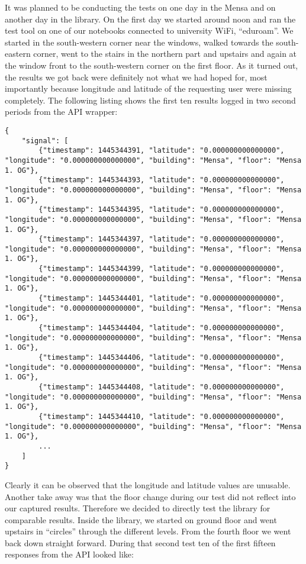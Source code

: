 It was planned to be conducting the tests on one day in the Mensa and on another day in the library. On the first day we started around noon and ran the test tool on one of our notebooks connected to university WiFi, \enquote{eduroam}. We started in the south-western corner near the windows, walked towards the south-eastern corner, went to the stairs in the northern part and upstairs and again at the window front to the south-western corner on the first floor. As it turned out, the results we got back were definitely not what we had hoped for, most importantly because longitude and latitude of the requesting user were missing completely. The following listing shows the first ten results logged in two second periods from the API wrapper:

\begin{lstlisting}
{
    "signal": [
        {"timestamp": 1445344391, "latitude": "0.000000000000000", "longitude": "0.000000000000000", "building": "Mensa", "floor": "Mensa 1. OG"},
        {"timestamp": 1445344393, "latitude": "0.000000000000000", "longitude": "0.000000000000000", "building": "Mensa", "floor": "Mensa 1. OG"},
        {"timestamp": 1445344395, "latitude": "0.000000000000000", "longitude": "0.000000000000000", "building": "Mensa", "floor": "Mensa 1. OG"},
        {"timestamp": 1445344397, "latitude": "0.000000000000000", "longitude": "0.000000000000000", "building": "Mensa", "floor": "Mensa 1. OG"},
        {"timestamp": 1445344399, "latitude": "0.000000000000000", "longitude": "0.000000000000000", "building": "Mensa", "floor": "Mensa 1. OG"},
        {"timestamp": 1445344401, "latitude": "0.000000000000000", "longitude": "0.000000000000000", "building": "Mensa", "floor": "Mensa 1. OG"},
        {"timestamp": 1445344404, "latitude": "0.000000000000000", "longitude": "0.000000000000000", "building": "Mensa", "floor": "Mensa 1. OG"},
        {"timestamp": 1445344406, "latitude": "0.000000000000000", "longitude": "0.000000000000000", "building": "Mensa", "floor": "Mensa 1. OG"},
        {"timestamp": 1445344408, "latitude": "0.000000000000000", "longitude": "0.000000000000000", "building": "Mensa", "floor": "Mensa 1. OG"},
        {"timestamp": 1445344410, "latitude": "0.000000000000000", "longitude": "0.000000000000000", "building": "Mensa", "floor": "Mensa 1. OG"},
        ...
    ]
}
\end{lstlisting}

Clearly it can be observed that the longitude and latitude values are unusable. Another take away was that the floor change during our test did not reflect into our captured results. Therefore we decided to directly test the library for comparable results. Inside the library, we started on ground floor and went upstairs in \enquote{circles} through the different levels. From the fourth floor we went back down straight forward. During that second test ten of the first fifteen responses from the API looked like:

